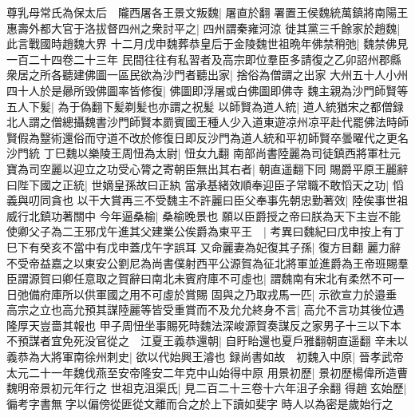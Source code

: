 尊乳母常氏為保太后　隴西屠各王景文叛魏|{
	屠直於翻}
署置王侯魏統萬鎮將南陽王惠壽外都大官于洛拔督四州之衆討平之|{
	四州謂秦雍河涼}
徙其黨三千餘家於趙魏|{
	此言戰國時趙魏大界}
十二月戊申魏葬恭皇后于金陵魏世祖晩年佛禁稍弛|{
	魏禁佛見一百二十四卷二十三年}
民間往往有私習者及高宗即位羣臣多請復之乙卯詔州郡縣衆居之所各聽建佛圖一區民欲為沙門者聽出家|{
	捨俗為僧謂之出家}
大州五十人小州四十人於是曏所毁佛圖率皆修復|{
	佛圖即浮屠或白佛圖即佛寺}
魏主親為沙門師賢等五人下髪|{
	為于偽翻下髪剃髪也亦謂之祝髪}
以師賢為道人統|{
	道人統猶宋之都僧録北人謂之僧總攝魏書沙門師賢本罽賓國王種人少入道東遊凉州凉平赴代罷佛法時師賢假為毉術還俗而守道不改於修復日即反沙門為道人統和平初師賢卒曇曜代之更名沙門統}
丁巳魏以樂陵王周忸為太尉|{
	忸女九翻}
南部尚書陸麗為司徒鎮西將軍杜元寶為司空麗以迎立之功受心膂之寄朝臣無出其右者|{
	朝直遥翻下同}
賜爵平原王麗辭曰陛下國之正統|{
	世嫡皇孫故曰正紈}
當承基緒效順奉迎臣子常職不敢慆天之功|{
	慆義與叨同貪也}
以干大賞再三不受魏主不許麗曰臣父奉事先朝忠勤著效|{
	陸俟事世祖威行北鎮功著關中}
今年逼桑榆|{
	桑榆晚景也}
願以臣爵授之帝曰朕為天下主豈不能使卿父子為二王邪戊午進其父建業公俟爵為東平王　|{
	考異曰魏紀曰戊申按上有丁巳下有癸亥不當中有戊申蓋戊午字誤耳}
又命麗妻為妃復其子孫|{
	復方目翻}
麗力辭不受帝益嘉之以東安公劉尼為尚書僕射西平公源賀為征北將軍並進爵為王帝班賜羣臣謂源賀曰卿任意取之賀辭曰南北未賓府庫不可虛也|{
	謂魏南有宋北有柔然不可一日弛備府庫所以供軍國之用不可虛於賞賜}
固與之乃取戎馬一匹|{
	示欲宣力於邉垂}
高宗之立也高允預其謀陸麗等皆受重賞而不及允允終身不言|{
	高允不言功其後位遇隆厚天豈嗇其報也}
甲子周忸坐事賜死時魏法深峻源賀奏謀反之家男子十三以下本不預謀者宜免死没官從之　江夏王義恭還朝|{
	自盱眙還也夏戶雅翻朝直遥翻}
辛未以義恭為大將軍南徐州刺史|{
	欲以代始興王濬也}
録尚書如故　初魏入中原|{
	晉孝武帝太元二十一年魏伐燕至安帝隆安二年克中山始得中原}
用景初歷|{
	景初歷楊偉所造曹魏明帝景初元年行之}
世祖克沮渠氏|{
	見二百二十三卷十六年沮子余翻}
得趙玄始歷|{
	徧考字書無字以偏傍從匪從文離而合之於上下讀如斐字}
時人以為密是歲始行之

